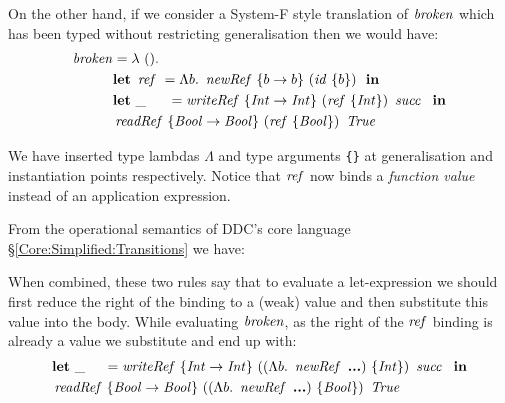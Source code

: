 On the other hand, if we consider a System-F style translation of $\operatorname{\mathit{broken}}$ which has been typed without restricting generalisation then we would have:
\begin{displaymath}
\begin{split}
\ibroken & = \lambda \ (). \\
   & \klet \ \iref \ 	    = \Lambda b. \ \inewRef \ \{b \to b\} \ (\iid \ \{b\}) \ \ \kin \\
   & \klet \ \_  \ \ \ \ \: = \iwriteRef \ \{ \iInt \rightarrow \iInt \} \ (\iref \ \{\iInt \}) \ \isucc \ \ \kin \\
   & \ireadRef \ \{ \iBool \to \iBool\} \ (\iref \ \{ \iBool \}) \ \iTrue \\
\end{split}
\end{displaymath}

We have inserted type lambdas $\Lambda$ and type arguments \texttt{\{\}} at generalisation and instantiation points respectively. Notice that $\operatorname{\mathit{ref}}$ now binds a \emph{function value} instead of an application expression. 

From the operational semantics of DDC's core language \S\ref{Core:Simplified:Transitions} we have:


When combined, these two rules say that to evaluate a let-expression we should first reduce the right of the binding to a (weak) value and then substitute this value into the body. While evaluating $\operatorname{\mathit{broken}}$, as the right of the $\operatorname{\mathit{ref}}$ binding is already a value we substitute and end up with:
\begin{displaymath}
\begin{split}
   & \klet \ \_  \ \ \ \  
   	= \iwriteRef \ \{ \iInt \to \iInt \} 
		\ ((\Lambda b. \ \inewRef \ \textbf{...} )\ \{\iInt \}) \ \isucc \ \ \kin \\
   &  \ireadRef \ \{\iBool \to \iBool\} \ ((\Lambda b. \ \inewRef \ \textbf{...} ) \ \{\iBool\}) \ \iTrue \\
\end{split}
\end{displaymath}

